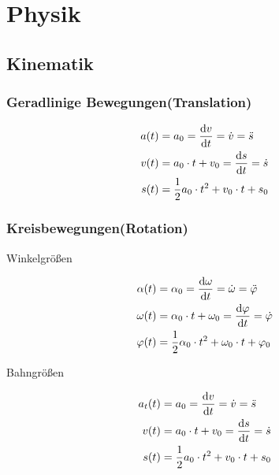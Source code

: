 \chapter{Physik}
\section{Kinematik}
\subsection{Geradlinige Bewegungen(Translation)}

\begin{shaded}
\begin{align}
	a(t)&=a_0=\frac{\mathop{}\!\mathrm{d} v}{\mathop{}\!\mathrm{d} t}=\dot{v}=\ddot{s} \\
	v(t)&=a_0\cdot t+v_0=\frac{\mathop{}\!\mathrm{d} s}{\mathop{}\!\mathrm{d} t}=\dot{s} \\
	s(t)&=\frac{1}{2}a_0\cdot t^2+v_0\cdot t+s_0
\end{align}
\end{shaded}

\subsection{Kreisbewegungen(Rotation)}

\begin{boxleft}
Winkelgrößen
\end{boxleft}\begin{boxrightshaded}
\begin{align}
\alpha(t)&=\alpha_0=\frac{\mathop{}\!\mathrm{d} \omega}{\mathop{}\!\mathrm{d} t}=\dot{\omega}=\ddot{\varphi} \\
\omega(t)&=\alpha_0\cdot t+\omega_0=\frac{\mathop{}\!\mathrm{d} \varphi}{\mathop{}\!\mathrm{d} t}=\dot{\varphi} \\
\varphi(t)&=\frac{1}{2}\alpha_0\cdot t^2+\omega_0\cdot t+\varphi_0
\end{align}
\end{boxrightshaded}

\begin{boxleft}
Bahngrößen
\end{boxleft}\begin{boxrightshaded}
\begin{align}
a_t(t)&=a_0=\frac{\mathop{}\!\mathrm{d} v}{\mathop{}\!\mathrm{d} t}=\dot{v}=\ddot{s} \\
v(t)&=a_0\cdot t+v_0=\frac{\mathop{}\!\mathrm{d} s}{\mathop{}\!\mathrm{d} t}=\dot{s} \\
s(t)&=\frac{1}{2}a_0\cdot t^2+v_0\cdot t+s_0
\end{align}
\end{boxrightshaded}


